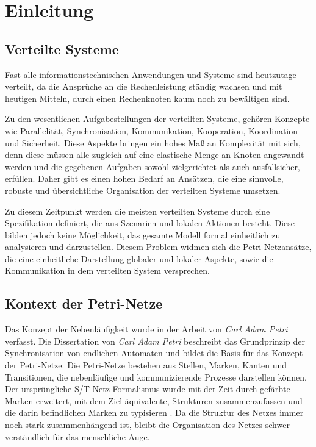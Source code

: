 \chapter{Einleitung}

\section{Verteilte Systeme}

	Fast alle informationstechnischen Anwendungen und Systeme sind heutzutage verteilt, da die Ansprüche an die Rechenleistung ständig wachsen und mit heutigen Mitteln, durch einen Rechenknoten kaum noch zu bewältigen sind. \bigbreak

	Zu den wesentlichen Aufgabestellungen der verteilten Systeme, gehören Konzepte wie Parallelität, Synchronisation, Kommunikation, Kooperation, Koordination und Sicherheit. Diese Aspekte bringen ein hohes Maß an Komplexität mit sich, denn diese müssen alle zugleich auf eine elastische Menge an Knoten angewandt werden und die gegebenen Aufgaben sowohl zielgerichtet als auch ausfallsicher, erfüllen. Daher gibt es einen hohen Bedarf an Ansätzen, die eine sinnvolle, robuste und übersichtliche Organisation der verteilten Systeme umsetzen. \bigbreak

	Zu diesem Zeitpunkt werden die meisten verteilten Systeme durch eine Spezifikation definiert, die aus Szenarien und lokalen Aktionen besteht. Diese bilden jedoch keine Möglichkeit, das gesamte Modell formal einheitlich zu analysieren und darzustellen. Diesem Problem widmen sich die Petri-Netzansätze, die eine einheitliche Darstellung globaler und lokaler Aspekte, sowie die Kommunikation in dem verteilten System versprechen. \cite{ochsenschlager2013modellierung}

\section{Kontext der Petri-Netze} \label{sec:KdP} 

	Das Konzept der Nebenläufigkeit wurde in der Arbeit von \textit{Carl Adam Petri} verfasst. Die Dissertation von \textit{Carl Adam Petri} \cite{Petr} beschreibt das Grundprinzip der Synchronisation von endlichen Automaten und bildet die Basis für das Konzept der Petri-Netze. Die Petri-Netze bestehen aus Stellen, Marken, Kanten und Transitionen, die nebenläufige und kommunizierende Prozesse darstellen können. Der ursprüngliche S/T-Netz \cite{Jess} Formalismus wurde mit der Zeit durch gefärbte Marken erweitert, mit dem Ziel äquivalente, Strukturen zusammenzufassen und die darin befindlichen Marken zu typisieren \cite{Kummer02}. Da die Struktur des Netzes immer noch stark zusammenhängend ist, bleibt die Organisation des Netzes schwer verständlich für das menschliche Auge.\bigbreak

